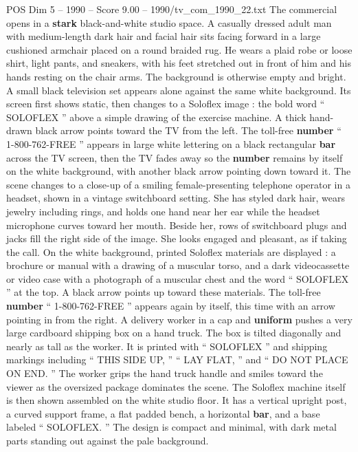 \begin{textsample}{POS Dim 5 – 1990 – Score 9.00 – 1990/tv\_com\_1990\_22.txt}  \label{ex:f5_pos_013}
The commercial opens in a \textbf{stark} black-and-white studio space.
A casually dressed adult man with medium-length dark hair and facial hair sits facing forward in a large cushioned armchair placed on a round braided rug.
He wears a plaid robe or loose shirt, light pants, and sneakers, with his feet stretched out in front of him and his hands resting on the chair arms.
The background is otherwise empty and bright.
A small black television set appears alone against the same white background.
Its screen first shows static, then changes to a Soloflex image : the bold word “ SOLOFLEX ” above a simple drawing of the exercise machine.
A thick hand-drawn black arrow points toward the TV from the left.
The toll-free \textbf{number} “ 1-800-762-FREE ” appears in large white lettering on a black rectangular \textbf{bar} across the TV screen, then the TV fades away so the \textbf{number} remains by itself on the white background, with another black arrow pointing down toward it.
The scene changes to a close-up of a smiling female-presenting telephone operator in a headset, shown in a vintage switchboard setting.
She has styled dark hair, wears jewelry including rings, and holds one hand near her ear while the headset microphone curves toward her mouth.
Beside her, rows of switchboard plugs and jacks fill the right side of the image.
She looks engaged and pleasant, as if taking the call.
On the white background, printed Soloflex materials are displayed : a brochure or manual with a drawing of a muscular torso, and a dark videocassette or video case with a photograph of a muscular chest and the word “ SOLOFLEX ” at the top.
A black arrow points up toward these materials.
The toll-free \textbf{number} “ 1-800-762-FREE ” appears again by itself, this time with an arrow pointing in from the right.
A delivery worker in a cap and \textbf{uniform} pushes a very large cardboard shipping box on a hand truck.
The box is tilted diagonally and nearly as tall as the worker.
It is printed with “ SOLOFLEX ” and shipping markings including “ THIS SIDE UP, ” “ LAY FLAT, ” and “ DO NOT PLACE ON END. ” The worker grips the hand truck handle and smiles toward the viewer as the oversized package dominates the scene.
The Soloflex machine itself is then shown assembled on the white studio floor.
It has a vertical upright post, a curved support frame, a flat padded bench, a horizontal \textbf{bar}, and a base labeled “ SOLOFLEX. ” The design is compact and minimal, with dark metal parts standing out against the pale background.

\end{textsample}
